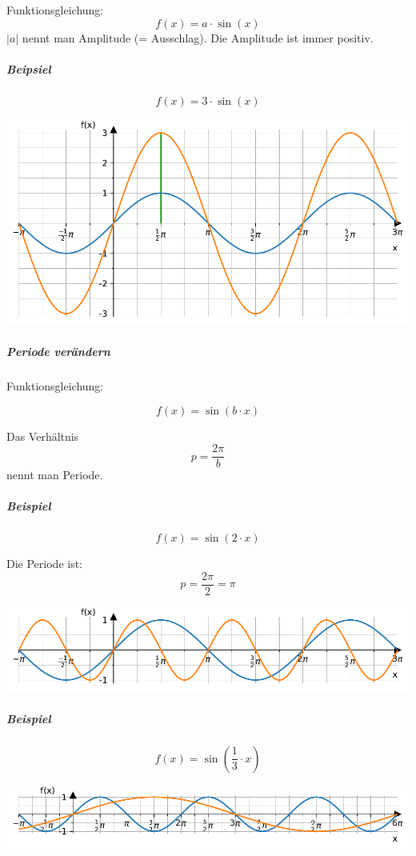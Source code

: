 \documentclass[
  11pt,
  a4paper,
  DIV=11,
  numbers=noendperiod]{scrartcl}
\let\oldsubparagraph\subparagraph
\renewcommand{\subparagraph}[1]{\oldsubparagraph{#1}\mbox{}}
\begin{document}
Funktionsgleichung: \[
f(x)=a\cdot \sin(x)
\] \(|a|\) nennt man Amplitude (= Ausschlag). Die Amplitude ist immer
positiv.

\subparagraph{Beipsiel}\label{beipsiel-1}

\[
f(x)= 3\cdot \sin(x)
\]

\includegraphics{7_Trigonometrische_Funktionen_files/figure-pdf/cell-13-output-1.pdf}

\subparagraph{Periode verändern}\label{periode-veruxe4ndern}

Funktionsgleichung:

\[
f(x)=\sin(b\cdot x)
\]

Das Verhältnis \[
p=\frac{2\pi}{b}
\] nennt man Periode.

\subparagraph{Beispiel}\label{beispiel-1}

\[
f(x)= \sin(2\cdot x)
\]

Die Periode ist: \[
p = \frac{2 \pi}{2}=\pi
\]

\includegraphics{7_Trigonometrische_Funktionen_files/figure-pdf/cell-14-output-1.pdf}

\subparagraph{Beispiel}\label{beispiel-2}

\[
f(x)= \sin\left(\frac{1}{3}\cdot x\right)
\]

\includegraphics{7_Trigonometrische_Funktionen_files/figure-pdf/cell-15-output-1.pdf}
\end{document}
